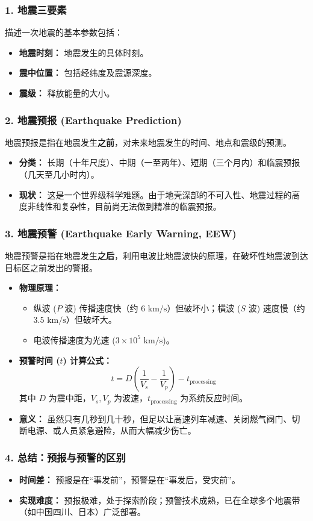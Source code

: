 \documentclass[12pt,a4paper]{article}
\begin{document}
	\subsubsection{1. 地震三要素}
	描述一次地震的基本参数包括：
	\begin{itemize}
		\item \textbf{地震时刻：} 地震发生的具体时刻。
		\item \textbf{震中位置：} 包括经纬度及震源深度。
		\item \textbf{震级：} 释放能量的大小。
	\end{itemize}
	
	\subsubsection{2. 地震预报 (Earthquake Prediction)}
	地震预报是指在地震发生\textbf{之前}，对未来地震发生的时间、地点和震级的预测。
	\begin{itemize}
		\item \textbf{分类：} 长期（十年尺度）、中期（一至两年）、短期（三个月内）和临震预报（几天至几小时内）。
		\item \textbf{现状：} 这是一个世界级科学难题。由于地壳深部的不可入性、地震过程的高度非线性和复杂性，目前尚无法做到精准的临震预报。
	\end{itemize}
	
	\subsubsection{3. 地震预警 (Earthquake Early Warning, EEW)}
	地震预警是指在地震发生\textbf{之后}，利用电波比地震波快的原理，在破坏性地震波到达目标区之前发出的警报。
	\begin{itemize}
		\item \textbf{物理原理：} 
		\begin{itemize}
			\item 纵波 ($P$ 波) 传播速度快（约 $6 \text{ km/s}$）但破坏小；横波 ($S$ 波) 速度慢（约 $3.5 \text{ km/s}$）但破坏大。
			\item 电波传播速度为光速 ($3 \times 10^5 \text{ km/s}$)。
		\end{itemize}
		\item \textbf{预警时间 ($t$) 计算公式：}
		\begin{equation}
			t = D \left( \frac{1}{V_s} - \frac{1}{V_p} \right) - t_{\text{processing}}
		\end{equation}
		其中 $D$ 为震中距，$V_s, V_p$ 为波速，$t_{\text{processing}}$ 为系统反应时间。
		\item \textbf{意义：} 虽然只有几秒到几十秒，但足以让高速列车减速、关闭燃气阀门、切断电源、或人员紧急避险，从而大幅减少伤亡。
	\end{itemize}
	
	\subsubsection{4. 总结：预报与预警的区别}
	\begin{itemize}
		\item \textbf{时间差：} 预报是在“事发前”，预警是在“事发后，受灾前”。
		\item \textbf{实现难度：} 预报极难，处于探索阶段；预警技术成熟，已在全球多个地震带（如中国四川、日本）广泛部署。
	\end{itemize}
	
	
	
	
	
	
\end{document}
